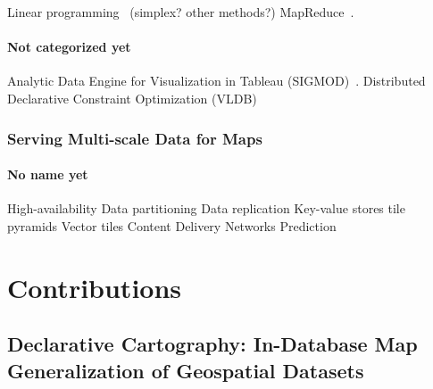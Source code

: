 \documentclass[11pt, oneside]{report}
\begin{document}
{Linear programming~\cite{haunert2006landcover, sarma2012fusiontables} (simplex? other methods?)
MapReduce~\cite{aji2013hadoopgis}.

\subsection{Not categorized yet}

Analytic Data Engine for Visualization in Tableau (SIGMOD)~\cite{wesley2011tableau}.
Distributed Declarative Constraint Optimization (VLDB)~\cite{liu2012cologne}




\section{Serving Multi-scale Data for Maps}
\label{related:work:serving}


\subsection{No name yet}
High-availability
Data partitioning
Data replication
Key-value stores
tile pyramids
Vector tiles
Content Delivery Networks
Prediction






\part{Contributions}

\chapter{Declarative Cartography: In-Database Map Generalization of Geospatial Datasets}
\label{chapter:cvl}
\lstset{
  language=cvl
}

}
\end{document}
